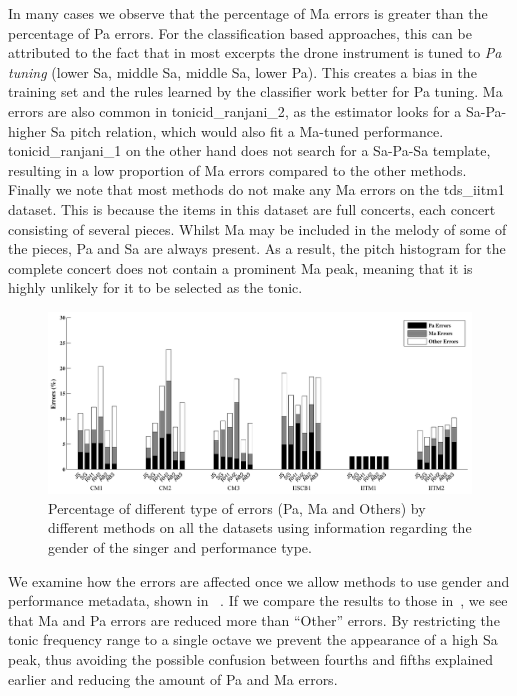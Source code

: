 {{In many cases we observe that the percentage of Ma errors is greater than the percentage of Pa errors. For the classification based approaches, this can be
attributed to the fact that in most excerpts the drone instrument is tuned to \textit{Pa tuning} (lower Sa, middle Sa, middle Sa, lower Pa). This creates a
bias in the training set and the rules learned by the classifier work better for Pa tuning. Ma errors are also common in \acrshort{tonicid_ranjani_2}, as the estimator looks for a Sa-Pa-higher Sa pitch relation, which would also fit a Ma-tuned performance. \acrshort{tonicid_ranjani_1} on the other hand does not search for a Sa-Pa-Sa template, resulting in a low proportion of Ma errors compared to the other methods. Finally we note that most methods do not make any Ma errors on the \acrshort{tds_iitm1} dataset. This is because the items in this dataset are full concerts, each concert consisting of several pieces. Whilst Ma may be included in the melody of some of the pieces, Pa and Sa are always present. As a result, the pitch histogram for the complete concert does not contain a prominent Ma peak, meaning that it is highly unlikely for it to be selected as the tonic.

\begin{figure}
	\begin{center}
		\includegraphics[width=\figSizeHundred]{ch05_preprocessing/figures/ErrorAnalysis_With_MF.pdf}
	\end{center}
	\caption{Percentage of different type of errors (Pa, Ma  and Others) by different methods on all the datasets using information regarding the gender of the singer and performance type. }
	\label{fig:tonic_identification_errors_with_MF}
\end{figure}

We examine how the errors are affected once we allow methods to use gender and performance metadata, shown in ~. If we compare the results to those in~, we see
that Ma and Pa errors are reduced more than ``Other'' errors. By restricting the tonic frequency range to a single octave we prevent the
appearance of a high Sa peak, thus avoiding the possible confusion between fourths and fifths explained earlier and reducing the amount of Pa and Ma errors.

}}
